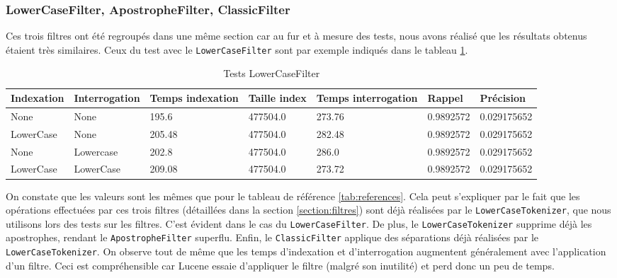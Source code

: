 \subsubsection{LowerCaseFilter, ApostropheFilter, ClassicFilter}
\label{section:filtrespourris}

Ces trois filtres ont été regroupés dans une même section car au fur et à mesure des tests, nous avons réalisé que les résultats obtenus étaient très similaires. Ceux du test avec le \texttt{LowerCaseFilter} sont par exemple indiqués dans le tableau \ref{tab:tests_LowerCaseFilter}.

\begin{table}[!htbp]
    \hspace{-2cm}
                \begin{tabular}{|p{2.5cm}|p{2.5cm}|p{2cm}|p{2cm}|p{2.5cm}|p{2cm}|p{2cm}|}
                    \hline
                    \textbf{Indexation} & \textbf{Interrogation} & \textbf{Temps \mbox{indexation}} & \textbf{Taille \mbox{index}} & \textbf{Temps \mbox{interrogation}} & \textbf{Rappel} & \textbf{Précision}\\
                    \hline
                    None & None & 195.6 & 477504.0 & 273.76 & 0.9892572 & 0.029175652\\
                    \hline
LowerCase & None & 205.48 & 477504.0 & 282.48 & 0.9892572 & 0.029175652\\
		\hline
None & Lowercase & 202.8 & 477504.0 & 286.0 & 0.9892572 & 0.029175652\\
		\hline
LowerCase & LowerCase & 209.08 & 477504.0 & 273.72 & 0.9892572 & 0.029175652\\
                    \hline
                \end{tabular}
                \caption{Tests LowerCaseFilter}
                \label{tab:tests_LowerCaseFilter}
            \end{table}

On constate que les valeurs sont les mêmes que pour le tableau de référence \ref{tab:references}. Cela peut s'expliquer par le fait que les opérations effectuées par ces trois filtres (détaillées dans la section \ref{section:filtres}) sont déjà réalisées par le \texttt{LowerCaseTokenizer}, que nous utilisons lors des tests sur les filtres. C’est évident dans le cas du \texttt{LowerCaseFilter}. De plus, le \texttt{LowerCaseTokenizer} supprime déjà les apostrophes, rendant le \texttt{ApostropheFilter} superflu. Enfin, le \texttt{ClassicFilter} applique des séparations déjà réalisées par le \texttt{LowerCaseTokenizer}. On observe tout de même que les temps d’indexation et d’interrogation augmentent généralement  avec l’application d’un filtre. Ceci est compréhensible car Lucene essaie d’appliquer le filtre (malgré son inutilité) et perd donc un peu de temps.

